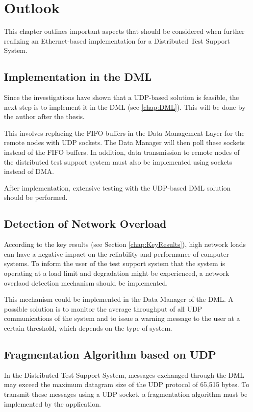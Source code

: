 \chapter{Outlook} \label{chap:Outlook}
This chapter outlines important aspects that should be considered when further realizing an Ethernet-based implementation for a Distributed Test Support System.

\section{Implementation in the DML}
Since the investigations have shown that a UDP-based solution is feasible, the next step is to implement it in the DML (see \ref{chap:DML}). This will be done by the author after the thesis.

This involves replacing the FIFO buffers in the Data Management Layer for the remote nodes with UDP sockets. The Data Manager will then poll these sockets instead of the FIFO buffers. In addition, data transmission to remote nodes of the distributed test support system must also be implemented using sockets instead of DMA.

After implementation, extensive testing with the UDP-based DML solution should be performed.

\section{Detection of Network Overload}
According to the key results (see Section \ref{chap:KeyResults}), high network loads can have a negative impact on the reliability and performance of computer systems. To inform the user of the test support system that the system is operating at a load limit and degradation might be experienced, a network overlaod detection mechanism should be implemented.

This mechanism could be implemented in the Data Manager of the DML. A possible solution is to monitor the average throughput of all UDP communications of the system and to issue a warning message to the user at a certain threshold, which depends on the type of system.

\section{Fragmentation Algorithm based on UDP}
In the Distributed Test Support System, messages exchanged through the DML may exceed the maximum datagram size of the UDP protocol of 65,515 bytes. To transmit these messages using a UDP socket, a fragmentation algorithm must be implemented by the application.

